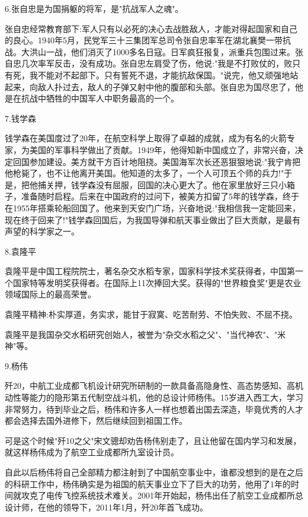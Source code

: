 \documentclass[UTF8]{ctexart}
\begin{document}
6.张自忠是为国捐躯的将军，是"抗战军人之魂"。\par
张自忠经常教育部下:军人只有以必死的决心去战胜敌人，才能对得起国家和自己的良心。1940年5月，民党军三十三集团军总司令张自忠率军在湖北襄樊一带抗战。大洪山一战，他们消灭了1000多名日寇。日军疯狂报复，派重兵包围过来。张自忠几次率军反击，没有成功。张自忠左肩受了伤，他说:"我是不打败仗的，败只有死，我不能对不起部下。只有誓死不退，才能抗敌保国。"说完，他又顽强地站起来，向敌人扑过去，敌人的子弹又射中他的腹部和头部。张自忠为国尽忠了，他是在抗战中牺牲的中国军人中职务最高的一个。\par
7.钱学森\par
钱学森在美国度过了20年，在航空科学上取得了卓越的成就，成为有名的火箭专家，为美国的军事科学做出了贡献。1949年，他得知新中国成立了，非常兴奋，决定回国参加建设。美方就干方百计地阻挠。美国海军次长还恶狠狠地说:"我宁肯把他枪毙了，也不让他离开美国。他知道的太多了，一个人可顶五个师的兵力!"于是，把他捕关押，钱学森没有屈服，回国的决心更大了。他在家里放好三只小箱子，准备随时启程。后来在中国政府的过问下，被美方扣留了5年的钱学森，终于在1955年搭乘轮船回国了。他来到天安门广场，兴奋地说:"我相信我一定能回来，现在终于回来了!"钱学森回国后，为我国导弹和航天事业做出了巨大贡献，是最有声望的科学家之一。\par
8.袁隆平\par
袁隆平是中国工程院院士，著名杂交水稻专家，国家科学技术奖获得者，中国第一个国家特等发明奖获得者。在国际上11次捧回大奖。获得的"世界粮食奖"更是农业领域国际上的最高荣誉。\par
袁隆平精神:朴实厚道，务实求，能甘于寂寞、吃苦耐劳、不怕失败、不屈不挠。\par
袁隆平是我国杂交水稻研究创始人，被誉为"杂交水稻之父"、"当代神农"、"米神"等。\par
9.杨伟\par
歼20，中航工业成都飞机设计研究所研制的一款具备高隐身性、高态势感知、高机动性等能力的隐形第五代制空战斗机，他的总设计师杨伟。15岁进入西工大，学习非常努力，待到毕业之后，杨伟和许多人一样也想着出国去深造，毕竟优秀的人才都会选择去国外进修下，然后继续回到祖国工作。\par
可是这个时候"歼10之父"宋文骢却劝告杨伟别走了，且让他留在国内学习和发展，就这样杨伟成为了航空工业成都所九室设计员。\par
自此以后杨伟将自己全部精力都注射到了中国航空事业中，谁都没想到的是在之后的科研工作中，杨伟确实是为祖国的航天事业立下了巨大的功劳，他用了1年的时间就攻克了电传飞控系统技术难关。2001年开始起，杨伟出任了航空工业成都所总设计师，在他的领导下，2011年1月，歼20年首飞成功。\par
\end{document}
